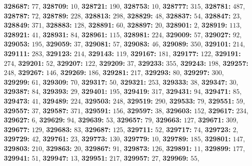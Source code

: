 \textsf{\bfseries 328687:} $77$, \textsf{\bfseries 328709:} $10$, \textsf{\bfseries 328721:} $190$, \textsf{\bfseries 328753:} $10$, \textsf{\bfseries 328777:} $315$, \textsf{\bfseries 328781:} $487$, \textsf{\bfseries 328787:} $72$, \textsf{\bfseries 328789:} $228$, \textsf{\bfseries 328813:} $298$, \textsf{\bfseries 328829:} $48$, \textsf{\bfseries 328837:} $54$, \textsf{\bfseries 328847:} $23$, \textsf{\bfseries 328849:} $371$, \textsf{\bfseries 328883:} $128$, \textsf{\bfseries 328891:} $60$, \textsf{\bfseries 328897:} $20$, \textsf{\bfseries 328901:} $2$, \textsf{\bfseries 328919:} $113$, \textsf{\bfseries 328921:} $41$, \textsf{\bfseries 328931:} $84$, \textsf{\bfseries 328961:} $115$, \textsf{\bfseries 328981:} $224$, \textsf{\bfseries 329009:} $57$, \textsf{\bfseries 329027:} $92$, \textsf{\bfseries 329053:} $195$, \textsf{\bfseries 329059:} $37$, \textsf{\bfseries 329081:} $57$, \textsf{\bfseries 329083:} $46$, \textsf{\bfseries 329089:} $350$, \textsf{\bfseries 329101:} $214$, \textsf{\bfseries 329111:} $283$, \textsf{\bfseries 329123:} $214$, \textsf{\bfseries 329143:} $119$, \textsf{\bfseries 329167:} $181$, \textsf{\bfseries 329177:} $122$, \textsf{\bfseries 329191:} $274$, \textsf{\bfseries 329201:} $52$, \textsf{\bfseries 329207:} $122$, \textsf{\bfseries 329209:} $37$, \textsf{\bfseries 329233:} $355$, \textsf{\bfseries 329243:} $198$, \textsf{\bfseries 329257:} $248$, \textsf{\bfseries 329267:} $146$, \textsf{\bfseries 329269:} $186$, \textsf{\bfseries 329281:} $217$, \textsf{\bfseries 329293:} $80$, \textsf{\bfseries 329297:} $300$, \textsf{\bfseries 329299:} $61$, \textsf{\bfseries 329309:} $70$, \textsf{\bfseries 329317:} $50$, \textsf{\bfseries 329321:} $253$, \textsf{\bfseries 329333:} $38$, \textsf{\bfseries 329347:} $30$, \textsf{\bfseries 329387:} $84$, \textsf{\bfseries 329393:} $29$, \textsf{\bfseries 329401:} $195$, \textsf{\bfseries 329419:} $317$, \textsf{\bfseries 329431:} $94$, \textsf{\bfseries 329471:} $85$, \textsf{\bfseries 329473:} $41$, \textsf{\bfseries 329489:} $224$, \textsf{\bfseries 329503:} $248$, \textsf{\bfseries 329519:} $290$, \textsf{\bfseries 329533:} $79$, \textsf{\bfseries 329551:} $59$, \textsf{\bfseries 329557:} $37$, \textsf{\bfseries 329587:} $371$, \textsf{\bfseries 329591:} $156$, \textsf{\bfseries 329597:} $38$, \textsf{\bfseries 329603:} $152$, \textsf{\bfseries 329617:} $234$, \textsf{\bfseries 329627:} $6$, \textsf{\bfseries 329629:} $94$, \textsf{\bfseries 329639:} $53$, \textsf{\bfseries 329657:} $79$, \textsf{\bfseries 329663:} $127$, \textsf{\bfseries 329671:} $309$, \textsf{\bfseries 329677:} $129$, \textsf{\bfseries 329683:} $83$, \textsf{\bfseries 329687:} $125$, \textsf{\bfseries 329711:} $52$, \textsf{\bfseries 329717:} $74$, \textsf{\bfseries 329723:} $2$, \textsf{\bfseries 329729:} $42$, \textsf{\bfseries 329761:} $23$, \textsf{\bfseries 329773:} $130$, \textsf{\bfseries 329779:} $10$, \textsf{\bfseries 329789:} $185$, \textsf{\bfseries 329801:} $147$, \textsf{\bfseries 329803:} $210$, \textsf{\bfseries 329863:} $20$, \textsf{\bfseries 329867:} $91$, \textsf{\bfseries 329873:} $126$, \textsf{\bfseries 329891:} $11$, \textsf{\bfseries 329899:} $177$, \textsf{\bfseries 329941:} $51$, \textsf{\bfseries 329947:} $13$, \textsf{\bfseries 329951:} $217$, \textsf{\bfseries 329957:} $27$, \textsf{\bfseries 329969:} $55$, 
